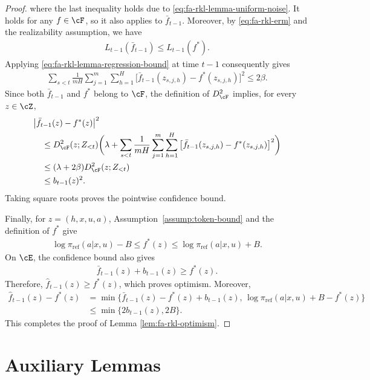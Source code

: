 \documentclass[11pt]{article}
\newcommand{\piref}{\pi_{\text{ref}}}
\begin{document}
\begin{proof}
where the last inequality holds due to \eqref{eq:fa-rkl-lemma-uniform-noise}. It holds for any $f \in \cF$, so it also applies to $\bar f_{t-1}$.
Moreover, by \eqref{eq:fa-rkl-erm} and the realizability assumption, we have
\begin{align*}
    L_{t-1}(\bar f_{t-1})
    \leq
    L_{t-1}(f^*).
\end{align*}
Applying \eqref{eq:fa-rkl-lemma-regression-bound}
at time $t-1$ consequently gives
\begin{align}
    \sum_{s<t}\frac1{mH}
    \sum_{j=1}^m\sum_{h=1}^H
    \big[
        \bar f_{t-1}(z_{s,j,h})
        -
        f^*(z_{s,j,h})
    \big]^2
    \leq2\beta.
    \label{eq:fa-rkl-lemma-erm-error}
\end{align}
Since both $\bar f_{t-1}$ and $f^*$ belong to $\cF$,
the definition of $D_{\cF}^2$ implies, for every $z\in\cZ$,
\begin{align*}
    &\big|\bar f_{t-1}(z)-f^*(z)\big|^2\\
    &\quad\leq
    D_{\cF}^2(z;Z_{<t})
    \bigg(
        \lambda
        +
        \sum_{s<t}\frac1{mH}
        \sum_{j=1}^m\sum_{h=1}^H
        \big[
            \bar f_{t-1}(z_{s,j,h})
            -
            f^*(z_{s,j,h})
        \big]^2
    \bigg)\\
    &\quad\leq
    (\lambda+2\beta)D_{\cF}^2(z;Z_{<t})\\
    &\quad\leq
    b_{t-1}(z)^2.
\end{align*}
Taking square roots proves the pointwise confidence bound.

Finally, for $z=(h,x,u,a)$, Assumption~\ref{assump:token-bound}
and the definition of $f^*$ give
\begin{align*}
    \log\piref(a|x,u)-B
    \leq f^*(z)
    \leq \log\piref(a|x,u)+B.
\end{align*}
On $\cE$, the confidence bound also gives
\begin{align*}
    \bar f_{t-1}(z)+b_{t-1}(z)
    \geq f^*(z).
\end{align*}
Therefore, $\hat f_{t-1}(z) \ge f^*(z)$, which proves optimism. Moreover,
\begin{align*}
    \hat f_{t-1}(z)-f^*(z)
    &=
    \min\big\{
        \bar f_{t-1}(z)-f^*(z)+b_{t-1}(z),\,
        \log\piref(a|x,u)+B-f^*(z)
    \big\}\\
    &\leq
    \min\{2b_{t-1}(z),2B\}.
\end{align*}
This completes the proof of Lemma \ref{lem:fa-rkl-optimism}.
\end{proof}
\section{Auxiliary Lemmas}
\label{sec:auxiliary-lemmas}
\end{document}
